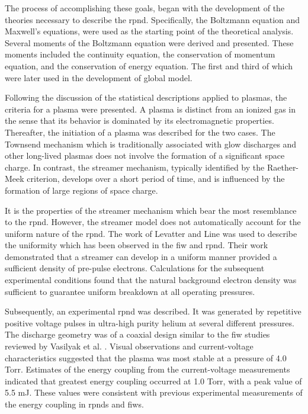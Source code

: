 The process of accomplishing these goals, began with the development of the
theories necessary to describe the \acs{rpnd}. Specifically, the Boltzmann
equation and Maxwell's equations, were used as the starting point of the
theoretical analysis. Several moments of the Boltzmann equation were derived and
presented. These moments included the continuity equation, the conservation of
momentum equation, and the conservation of energy equation. The first and third
of which were later used in the development of global model.

Following the discussion of the statistical descriptions applied to plasmas, the
criteria for a plasma were presented. A plasma is distinct from an ionized gas
in the sense that its behavior is dominated by its electromagnetic properties.
Thereafter, the initiation of a plasma was described for the two cases. The
Townsend mechanism which is traditionally associated with glow discharges and
other long-lived plasmas does not involve the formation of a significant space
charge. In contrast, the streamer mechanism, typically identified by the
Raether-Meek criterion, develops over a short period of time, and is influenced
by the formation of large regions of space charge.

It is the properties of the streamer mechanism which bear the most resemblance
to the \acs{rpnd}. However, the streamer model does not automatically account
for the uniform nature of the \acs{rpnd}. The work of Levatter and Line
\cite{Levatter1980} was used to describe the uniformity which has been observed
in the \acs{fiw} and \acs{rpnd}. Their work demonstrated that a streamer can
develop in a uniform manner provided a sufficient density of pre-pulse
electrons. Calculations for the subsequent experimental conditions found that
the natural background electron density was sufficient to guarantee uniform
breakdown at all operating pressures.

Subsequently, an experimental \acs{rpnd} was described. It was generated by
repetitive positive voltage pulses in ultra-high purity helium at several
different pressures. The discharge geometry was of a coaxial design similar to
the \acs{fiw} studies reviewed by Vasilyak et al. \cite{Vasilyak1994}. Visual
observations and current-voltage characteristics suggested that the plasma was
most stable at a pressure of 4.0 Torr. Estimates of the energy coupling from the
current-voltage measurements indicated that greatest energy coupling occurred at
1.0 Torr, with a peak value of 5.5 mJ. These values were consistent with previous
experimental measurements of the energy coupling in \acs{rpnd}s and \acs{fiw}s.

